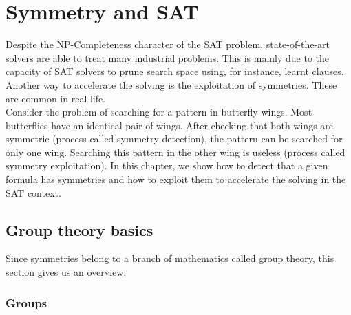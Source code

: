 \chapter{Symmetry and SAT}\label{chap:symmetryinsat}
\minitoc
Despite the NP-Completeness character of the SAT problem, state-of-the-art solvers are able to treat many industrial problems.
This is mainly due to the capacity of SAT solvers to prune search space using, for instance, learnt clauses.
Another way to accelerate the solving is the exploitation of symmetries.
These are common in real life. \\
Consider the problem of searching for a pattern in butterfly wings.
Most butterflies have an identical pair of wings. After checking that both wings are symmetric
(process called symmetry detection), the pattern can be searched for only one wing. Searching this pattern in the other wing is useless (process called symmetry exploitation). 
In this chapter, we show how to detect that a given formula has symmetries and how to
exploit them to accelerate the solving in the SAT context.

\section{Group theory basics} 
Since symmetries belong to a branch of mathematics called group theory, this section gives us an overview.
\subsection{Groups}

